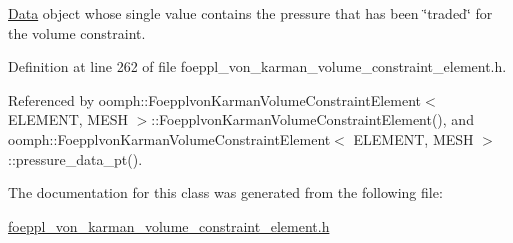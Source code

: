 \hyperlink{classoomph_1_1Data}{Data} object whose single value contains the pressure that has been \char`\"{}traded\char`\"{} for the volume constraint. 



Definition at line 262 of file foeppl\+\_\+von\+\_\+karman\+\_\+volume\+\_\+constraint\+\_\+element.\+h.



Referenced by oomph\+::\+Foepplvon\+Karman\+Volume\+Constraint\+Element$<$ E\+L\+E\+M\+E\+N\+T, M\+E\+S\+H $>$\+::\+Foepplvon\+Karman\+Volume\+Constraint\+Element(), and oomph\+::\+Foepplvon\+Karman\+Volume\+Constraint\+Element$<$ E\+L\+E\+M\+E\+N\+T, M\+E\+S\+H $>$\+::pressure\+\_\+data\+\_\+pt().



The documentation for this class was generated from the following file\+:\begin{DoxyCompactItemize}
\item 
\hyperlink{foeppl__von__karman__volume__constraint__element_8h}{foeppl\+\_\+von\+\_\+karman\+\_\+volume\+\_\+constraint\+\_\+element.\+h}\end{DoxyCompactItemize}
